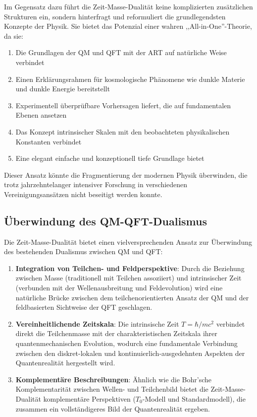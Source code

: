 \documentclass[12pt,a4paper]{article}  %
\begin{document}
	Im Gegensatz dazu führt die Zeit-Masse-Dualität keine komplizierten zusätzlichen Strukturen ein, sondern hinterfragt und reformuliert die grundlegendsten Konzepte der Physik. Sie bietet das Potenzial einer wahren ,,All-in-One''-Theorie, da sie:
	
	\begin{enumerate}
		\item Die Grundlagen der QM und QFT mit der ART auf natürliche Weise verbindet
		\item Einen Erklärungsrahmen für kosmologische Phänomene wie dunkle Materie und dunkle Energie bereitstellt
		\item Experimentell überprüfbare Vorhersagen liefert, die auf fundamentalen Ebenen ansetzen
		\item Das Konzept intrinsischer Skalen mit den beobachteten physikalischen Konstanten verbindet
		\item Eine elegant einfache und konzeptionell tiefe Grundlage bietet
	\end{enumerate}
	
	Dieser Ansatz könnte die Fragmentierung der modernen Physik überwinden, die trotz jahrzehntelanger intensiver Forschung in verschiedenen Vereinigungsansätzen nicht beseitigt werden konnte.
	
	\subsection{Überwindung des QM-QFT-Dualismus}
	
	Die Zeit-Masse-Dualität bietet einen vielversprechenden Ansatz zur Überwindung des bestehenden Dualismus zwischen QM und QFT:
	
	\begin{enumerate}
		\item \textbf{Integration von Teilchen- und Feldperspektive}: Durch die Beziehung zwischen Masse (traditionell mit Teilchen assoziiert) und intrinsischer Zeit (verbunden mit der Wellenausbreitung und Feldevolution) wird eine natürliche Brücke zwischen dem teilchenorientierten Ansatz der QM und der feldbasierten Sichtweise der QFT geschlagen.
		
		\item \textbf{Vereinheitlichende Zeitskala}: Die intrinsische Zeit $T = \hbar/mc^2$ verbindet direkt die Teilchenmasse mit der charakteristischen Zeitskala ihrer quantenmechanischen Evolution, wodurch eine fundamentale Verbindung zwischen den diskret-lokalen und kontinuierlich-ausgedehnten Aspekten der Quantenrealität hergestellt wird.
		
		\item \textbf{Komplementäre Beschreibungen}: Ähnlich wie die Bohr'sche Komplementarität zwischen Wellen- und Teilchenbild bietet die Zeit-Masse-Dualität komplementäre Perspektiven ($T_0$-Modell und Standardmodell), die zusammen ein vollständigeres Bild der Quantenrealität ergeben.
	\end{enumerate}
	
\end{document}
